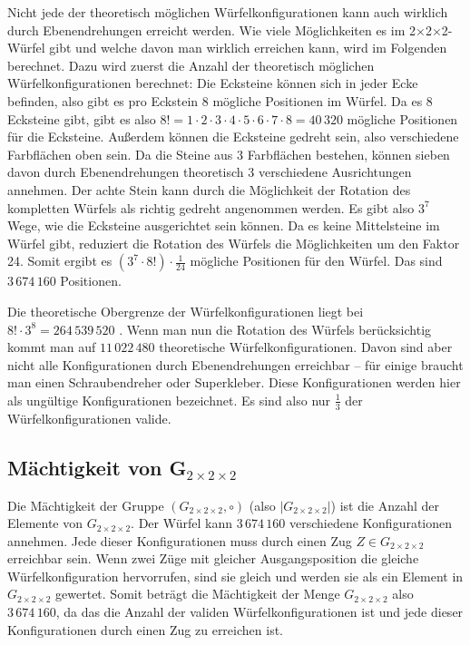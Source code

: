 \documentclass[12pt,a4paper, usenames, dvipsnames]{article}
\theoremstyle{mystyle}
\theoremstyle{definition}
\newcommand{\Gtwo}{\ensuremath{G_{2\times 2\times 2}}}
\newcommand{\Ttwo}{2$\times$2$\times$2-}
\begin{document}
Nicht jede der theoretisch möglichen Würfelkonfigurationen kann auch wirklich durch Ebenendrehungen erreicht werden. Wie viele Möglichkeiten es im \Ttwo Würfel gibt und welche davon man wirklich erreichen kann, wird im Folgenden berechnet. 
Dazu wird zuerst die Anzahl der theoretisch möglichen Würfelkonfigurationen berechnet:
Die Ecksteine können sich in jeder Ecke befinden, also gibt es pro Eckstein 8 mögliche Positionen im Würfel. Da es 8 Ecksteine gibt, gibt es also $8! = 1 \cdot 2 \cdot 3 \cdot 4 \cdot 5 \cdot 6 \cdot 7 \cdot 8 = 40\, 320$ mögliche Positionen für die Ecksteine.
Außerdem können die Ecksteine gedreht sein, also verschiedene Farbflächen oben sein. Da die Steine aus 3 Farbflächen bestehen, können sieben davon durch Ebenendrehungen theoretisch 3 verschiedene Ausrichtungen annehmen. Der achte Stein kann durch die Möglichkeit der Rotation des kompletten Würfels als richtig gedreht angenommen werden. Es gibt also $3^7$ Wege, wie die Ecksteine ausgerichtet sein können.
Da es keine Mittelsteine im Würfel gibt, reduziert die Rotation des Würfels die Möglichkeiten um den Faktor 24. 
Somit ergibt es $(3^7 \cdot 8!) \cdot \frac{1}{24}$ mögliche Positionen für den Würfel. Das sind $3\, 674\, 160$ Positionen.

Die theoretische Obergrenze der Würfelkonfigurationen liegt bei $8! \cdot 3^8 = 264 \, 539 \, 520$ \cite{MMFAA}. Wenn man nun die Rotation des Würfels berücksichtig kommt man auf $11 \, 022 \, 480$ theoretische Würfelkonfigurationen.
Davon sind aber nicht alle Konfigurationen durch Ebenendrehungen erreichbar -- für einige braucht man einen Schraubendreher oder Superkleber. Diese Konfigurationen werden hier als ungültige Konfigurationen bezeichnet. 
Es sind also nur $\frac{1}{3}$ der Würfelkonfigurationen valide.

%
%
%
%
%
%
%
%
%
%
%
%
%
%
%
%
%
%
%
\subsection*{Mächtigkeit von G$_{2\times 2\times 2}$}

Die Mächtigkeit der Gruppe $(\Gtwo,\circ)$ (also $|\Gtwo|$) ist die Anzahl der Elemente von $\Gtwo$. Der Würfel kann $3\, 674\, 160$ verschiedene Konfigurationen annehmen. Jede dieser Konfigurationen muss durch einen Zug $Z \in \Gtwo$ erreichbar sein. Wenn zwei Züge mit gleicher Ausgangsposition die gleiche Würfelkonfiguration hervorrufen, sind sie gleich und werden sie als ein Element in $\Gtwo$ gewertet.
Somit beträgt die Mächtigkeit der Menge $\Gtwo$ also $3\, 674\, 160$, da das die Anzahl der validen Würfelkonfigurationen ist und jede dieser Konfigurationen durch einen Zug zu erreichen ist.
\end{document}
